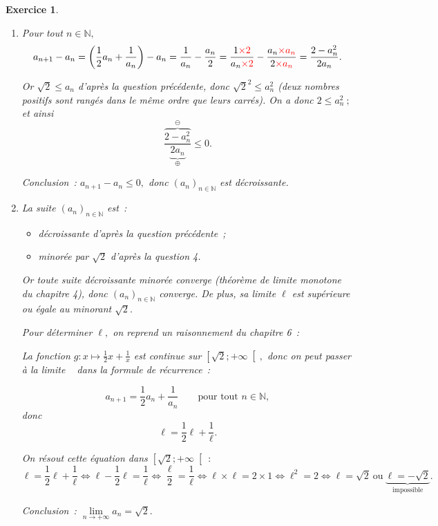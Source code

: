 \documentclass[10pt]{article}
\newtheorem{exo}{Exercice}
\begin{document}
\begin{exo}
\begin{enumerate}
\begin{itemize}
\begin{multicols}{2}
\medskip

\textbf{Remarque~:} $g\left(a_k\right)=a_{k+1}.$

\end{multicols}




\item[{\textbullet}] \textbf{Conclusion.} $\mathcal{P}_0$ est vraie et $\mathcal{P}_n$ est héréditaire, donc elle est vraie pour tout $n\in\mathbb{N}.$
\end{itemize}
\item Pour tout $n\in\mathbb{N},$
\[a_{n+1}-a_n=\left(\frac{1}{2}a_n+\frac{1}{a_n}\right)-a_n=\frac{1}{a_n}-\frac{a_n}{2}=
\frac{1\textcolor{red}{\times 2}}{a_n\textcolor{red}{\times 2}}-\frac{a_n\textcolor{red}{\times a_n}}{2\textcolor{red}{\times a_n}}=\frac{2-a_n^2}{2a_n}.\]

Or $\sqrt{2}\leq a_n$ d'après la question précédente, donc $\sqrt{2}^2\leq a_n^2$ (deux nombres positifs sont rangés dans le même ordre que leurs carrés). On a donc $2\leq a_n^2~;$ et ainsi
\[\frac{\overbrace{2-a_n^2}^{\ominus}}{\underbrace{2a_n}_{\oplus}}\leq 0.\]

Conclusion~: $a_{n+1}-a_n\leq 0,$ donc $\left(a_n\right)_{n\in\mathbb{N}}$ est décroissante.
\item La suite $\left(a_n\right)_{n\in\mathbb{N}}$ est~:

\begin{itemize}
\item[{\textbullet}] décroissante d'après la question précédente~;
\item[{\textbullet}] minorée par $\sqrt{2}$ d'après la question 4.
\end{itemize}

Or toute suite décroissante minorée converge (théorème de limite monotone du chapitre 4), donc $\left(a_n\right)_{n\in\mathbb{N}}$ converge. De plus, sa limite $\ell$ est supérieure ou égale au minorant $\sqrt{2}.$

\medskip

Pour déterminer $\ell,$ on reprend un raisonnement du chapitre 6~:

\medskip

La fonction $g:x\mapsto \frac{1}{2}x+\frac{1}{x}$ est continue sur $\left[\sqrt{2};+\infty\right[,$ donc on peut \og passer à la limite \fg~{} dans la formule de récurrence~:

\[a_{n+1}=\frac{1}{2}a_n+\frac{1}{a_n}\qquad\text{pour tout }n\in\mathbb{N},\] donc
\begin{equation}\ell=\frac{1}{2}\ell+\frac{1}{\ell}.
\end{equation}



On résout cette équation dans $\left[\sqrt{2};+\infty\right[~:$
\[\ell=\frac{1}{2}\ell+\frac{1}{\ell} \iff \ell-\frac{1}{2}\ell=\frac{1}{\ell}
\iff \frac{\ell}{2}=\frac{1}{\ell}\iff \ell\times\ell=2\times 1\iff \ell^2=2\iff \ell=\sqrt{2}~\text{ou}~\underbrace{\ell=-\sqrt{2}}_{\text{impossible}}.\]

Conclusion~: $\lim\limits_{n\to +\infty}a_n=\sqrt{2}.$
\end{enumerate}
\end{exo}
\end{document}
